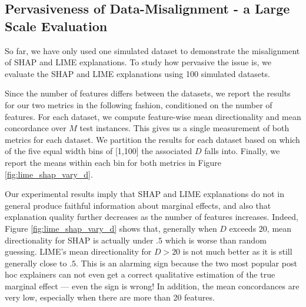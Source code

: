 \documentclass[mnsc,blindrev]{informs3}
\newcommand{\mG}{\mathcal{G}}
\newcommand{\mM}{\mathcal{M}}
\begin{document}
\subsection{Pervasiveness of Data-Misalignment - a Large Scale Evaluation}
    \label{sec:pervasive}
    So far, we have only used one simulated dataset to demonstrate the misalignment of SHAP and LIME explanations. To study how pervasive the issue is, %
    we evaluate the SHAP and LIME explanations using 100 simulated datasets.



        Since the number of features differs between the datasets, we report the results for our two metrics in the following fashion, conditioned on the number of features. %
        For each dataset, we compute feature-wise mean directionality and mean concordance over $M$ test instances.%
        This gives us a single measurement of both metrics for each dataset. We partition the results for each dataset based on which of the five equal width bins of [1,100] the associated $D$ falls into. Finally, we report the means within each bin for both metrics in Figure \ref{fig:lime_shap_vary_d}.  %

    
    Our experimental results imply that SHAP and LIME explanations do not in general produce faithful information about marginal effects, and also that explanation quality further decreases as the number of features increases. Indeed, Figure \ref{fig:lime_shap_vary_d} shows that, generally when $D$ exceeds $20$, mean directionality for SHAP is actually under $.5$ which is worse than random guessing. LIME's mean directionality for $D> 20$ is not much better as it is still generally close to $.5$. This is an alarming sign because the two most popular post hoc explainers can not even get a correct qualitative estimation of the true marginal effect --- even the sign is wrong! In addition, the mean concordances are very low, especially when there are more than 20 features. %
\end{document}
